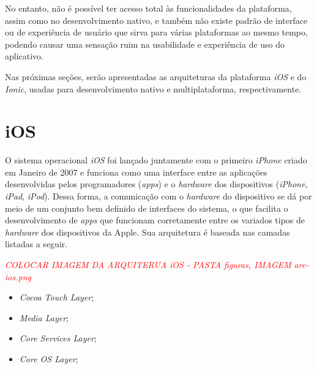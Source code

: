 No entanto, não é possível ter acesso total às funcionalidades da plataforma, assim como no desenvolvimento nativo, e também não existe padrão de interface ou de experiência de usuário que sirva
para várias plataformas ao mesmo tempo, podendo causar uma sensação ruim na usabilidade e experiência de uso do aplicativo. 


Nas próximas seções, serão apresentadas as arquiteturas da plataforma \textit{iOS} e do \textit{Ionic}, usadas para desenvolvimento nativo e multiplataforma, respectivamente.


\section{iOS} \label{ios}

O sistema operacional \textit{iOS} foi lançado juntamente com o primeiro \textit{iPhone} criado em Janeiro de 2007 e 
funciona como uma interface entre as aplicações desenvolvidas pelos programadores (\textit{apps}) e o \textit{hardware} 
dos dispositivos (\textit{iPhone}, \textit{iPad}, \textit{iPod}). Dessa forma, a comunicação com o \textit{hardware} do dispositivo se dá 
por meio de um conjunto bem definido de interfaces do sistema, o que facilita o desenvolvimento de \textit{apps} 
que funcionam corretamente entre os variados tipos de \textit{hardware} dos dispositivos da Apple. 
Sua arquitetura é baseada nas camadas listadas a seguir.%
 
\textit{\textcolor{red}{COLOCAR IMAGEM DA ARQUITERUA iOS - PASTA figuras, IMAGEM arc-ios.png}}

\begin{itemize}

	\item \textit{Cocoa Touch Layer};
	\item \textit{Media Layer};
	\item \textit{Core Services Layer};
	\item \textit{Core OS Layer};

\end{itemize}


